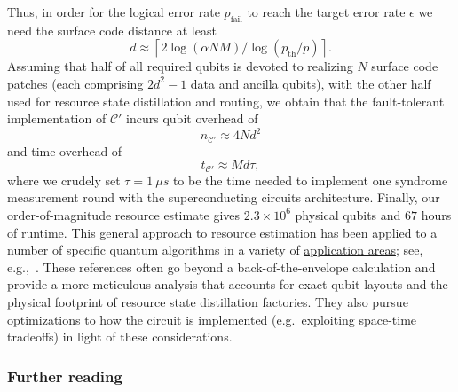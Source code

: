 \begin{refsection}
\begin{itemize}
Thus, in order for the logical error rate $p_\text{fail}$ to reach the target error rate $\epsilon$ we need the surface code distance at least
\begin{equation}
d \approx \left\lceil 2 \log(\alpha N M)/\log(p_\mathrm{th}/p) \right\rceil.
\end{equation}
Assuming that half of all required qubits is devoted to realizing $N$ surface code patches (each comprising $2d^2-1$ data and ancilla qubits), with the other half used for resource state distillation and routing,
we obtain that the fault-tolerant implementation of $\mathcal C'$ incurs qubit overhead of
\begin{equation}
n_{\mathcal C'} \approx 4Nd^2
\end{equation}
and time overhead of
\begin{equation}
t_{\mathcal C'} \approx Md\tau,
\end{equation}
where we crudely set $\tau = 1\ \!\mu s$ to be the time needed to implement one syndrome measurement round with the superconducting circuits architecture.
Finally, our order-of-magnitude resource estimate gives $2.3\times 10^6$ physical qubits and $67$ hours of runtime.
This general approach to resource estimation has been applied to a number of specific quantum algorithms in a variety of \hyperref[applications]{application areas}; see, e.g.,~\cite{lee2021EvenMoreEfficientChemistryTensorHyp, gidney2021HowToFactor, Kivlichan2020ImprovedFaultTolerantSimulationCondensedMatter,Beverland2022Requirements,sanders2020FTQCforCombOpt}. These references often go beyond a back-of-the-envelope calculation and provide a more meticulous analysis that accounts for exact qubit layouts and the physical footprint of resource state distillation factories. They also pursue optimizations to how the circuit is implemented (e.g.~exploiting space-time tradeoffs) in light of these considerations. 

\end{itemize}




\subsubsection*{Further reading}


\end{refsection}
